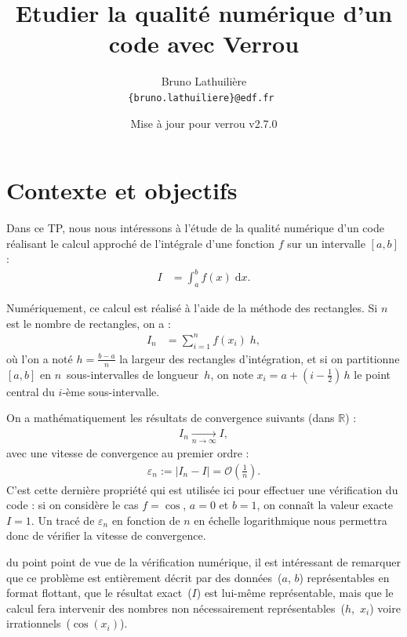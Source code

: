 \documentclass[a4paper]{article}
\title{Etudier la qualité numérique d'un code avec Verrou}
\author{Bruno Lathuilière\\
  \tt \{bruno.lathuiliere\}@edf.fr
}
\date{Mise à jour \cite{tpVerrou} pour verrou v2.7.0}
\newenvironment{info}[1][NB :]{
  \begin{mdframed}[style=info]
    \noindent{\bf #1}
}{
  \end{mdframed}
}
\begin{document}
\maketitle


\section*{Contexte et objectifs}

Dans ce TP, nous nous intéressons à l'étude de la qualité numérique d'un code
réalisant le calcul approché de l'intégrale d'une fonction $f$ sur un intervalle
$[a, b]$ :
\begin{align*}
  I &= \int_{a}^{b} f(x) \; \text{d}x.
\end{align*}

Numériquement, ce calcul est réalisé à l'aide de la méthode des rectangles. Si
$n$ est le nombre de rectangles, on a :
\begin{align*}
  I_n &= \sum_{i=1}^n f(x_i) \; h,
\end{align*}
où l'on a noté $h = \frac{b - a}{n}$ la largeur des rectangles d'intégration, et
si on partitionne $[a, b]$ en $n$~sous-intervalles de longueur~$h$, on note
$x_i = a + (i-\frac{1}{2}) \, h$ le point central du $i$-ème sous-intervalle.

\bigskip

On a mathématiquement les résultats de convergence suivants (dans $\mathbb{R}$) :
\begin{align*}
  I_n \xrightarrow[n \to \infty]{} I,
\end{align*}
avec une vitesse de convergence au premier ordre :
\begin{align*}
  \varepsilon_n := \left\vert I_n - I \right\vert = \mathcal{O}\left(\frac{1}{n}\right).
\end{align*}
C'est cette dernière propriété qui est utilisée ici pour effectuer une vérification
du code : si on considère le cas $f = \cos$, $a = 0$ et $b = 1$, on connaît
la valeur exacte $I=1$. Un tracé de $\varepsilon_n$ en fonction de $n$ en
échelle logarithmique nous permettra donc de vérifier la vitesse de convergence.

\bigskip

\begin{info}[Remarque :]
  du point point de vue de la vérification numérique, il est intéressant de
  remarquer que ce problème est entièrement décrit par des données~($a$, $b$)
  représentables en format flottant, que le résultat exact~($I$) est lui-même
  représentable, mais que le calcul fera intervenir des nombres non
  nécessairement re\-pré\-sen\-tables~\mbox{($h$, $x_i$)} voire
  irrationnels~($\cos(x_i)$).
\end{info}
\end{document}
